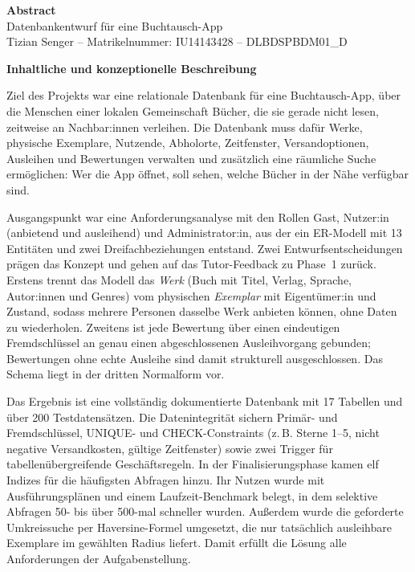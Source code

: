 \documentclass[11pt,a4paper]{article}
\begin{document}

\begin{center}
{\fontsize{12}{14}\selectfont\textbf{Abstract}}\\[4pt]
{\fontsize{12}{14}\selectfont Datenbankentwurf für eine Buchtausch-App}\\[2pt]
\normalsize Tizian Senger -- Matrikelnummer: IU14143428 -- DLBDSPBDM01\_D
\end{center}

\vspace{6pt}

{\fontsize{12}{14}\selectfont\textbf{Inhaltliche und konzeptionelle Beschreibung}}

Ziel des Projekts war eine relationale Datenbank für eine Buchtausch-App, über die Menschen einer lokalen Gemeinschaft Bücher, die sie gerade nicht lesen, zeitweise an Nachbar:innen verleihen. Die Datenbank muss dafür Werke, physische Exemplare, Nutzende, Abholorte, Zeitfenster, Versandoptionen, Ausleihen und Bewertungen verwalten und zusätzlich eine räumliche Suche ermöglichen: Wer die App öffnet, soll sehen, welche Bücher in der Nähe verfügbar sind.

Ausgangspunkt war eine Anforderungsanalyse mit den Rollen Gast, Nutzer:in (anbietend und ausleihend) und Administrator:in, aus der ein ER-Modell mit 13 Entitäten und zwei Dreifachbeziehungen entstand. Zwei Entwurfsentscheidungen prägen das Konzept und gehen auf das Tutor-Feedback zu Phase~1 zurück. Erstens trennt das Modell das \emph{Werk} (Buch mit Titel, Verlag, Sprache, Autor:innen und Genres) vom physischen \emph{Exemplar} mit Eigentümer:in und Zustand, sodass mehrere Personen dasselbe Werk anbieten können, ohne Daten zu wiederholen. Zweitens ist jede Bewertung über einen eindeutigen Fremdschlüssel an genau einen abgeschlossenen Ausleihvorgang gebunden; Bewertungen ohne echte Ausleihe sind damit strukturell ausgeschlossen. Das Schema liegt in der dritten Normalform vor.

Das Ergebnis ist eine vollständig dokumentierte Datenbank mit 17 Tabellen und über 200 Testdatensätzen. Die Datenintegrität sichern Primär- und Fremdschlüssel, UNIQUE- und CHECK-Constraints (z.\,B. Sterne 1--5, nicht negative Versandkosten, gültige Zeitfenster) sowie zwei Trigger für tabellenübergreifende Geschäftsregeln. In der Finalisierungsphase kamen elf Indizes für die häufigsten Abfragen hinzu. Ihr Nutzen wurde mit Ausführungsplänen und einem Laufzeit-Benchmark belegt, in dem selektive Abfragen 50- bis über 500-mal schneller wurden. Außerdem wurde die geforderte Umkreissuche per Haversine-Formel umgesetzt, die nur tatsächlich ausleihbare Exemplare im gewählten Radius liefert. Damit erfüllt die Lösung alle Anforderungen der Aufgabenstellung.
\end{document}
